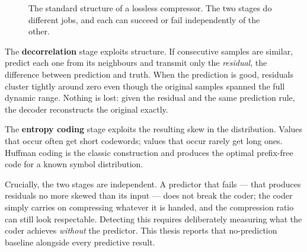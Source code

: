 \begin{figure}[t]
\centering
{}
\caption[Two-stage lossless compressor]{The standard structure of a lossless
compressor. The two stages do different jobs, and each can succeed or fail
independently of the other.}
\label{fig:twostage}
\end{figure}

The \textbf{decorrelation} stage exploits structure. If consecutive samples are
similar, predict each one from its neighbours and transmit only the
\emph{residual}, the difference between prediction and truth. When the
prediction is good, residuals cluster tightly around zero even though the
original samples spanned the full dynamic range. Nothing is lost: given the
residual and the same prediction rule, the decoder reconstructs the original
exactly.

The \textbf{entropy coding} stage exploits the resulting skew in the
distribution. Values that occur often get short codewords; values that occur
rarely get long ones. Huffman coding \cite{huffman1952} is the classic
construction and produces the optimal prefix-free code for a known symbol
distribution.

Crucially, the two stages are independent. A predictor that fails --- that
produces residuals no more skewed than its input --- does not break the coder;
the coder simply carries on compressing whatever it is handed, and the
compression ratio can still look respectable. Detecting this requires
deliberately measuring what the coder achieves \emph{without} the predictor.
This thesis reports that no-prediction baseline alongside every predictive
result.

